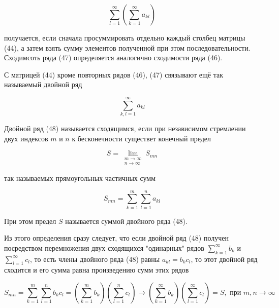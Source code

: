\begin{equation}
	\displaystyle\sum_{l = 1}^\infty \left( \displaystyle\sum_{k = 1}^\infty a_{kl} \right)
\end{equation}

получается, если сначала просуммировать отдельно каждый столбец матрицы (44), а затем взять сумму элементов полученной при этом последовательности. Сходимсоть ряда (47) определяется аналогично сходимости ряда (46).

С матрицей (44) кроме повторных рядов (46), (47) связывают ещё так называемый двойной ряд

\begin{equation}
	\displaystyle\sum_{k,l = 1}^\infty a_{kl}
\end{equation}

\begin{definition}
	Двойной ряд (48) называется сходящимся, если при независимом стремлении двух индексов $m$ и $n$ к бесконечности существет конечный предел
	
	\begin{equation}
		S = \displaystyle\lim_{\substack{m \rightarrow \infty \\ 
																		n \rightarrow \infty}} S_{mn}
	\end{equation}
	
	так называемых прямоугольных частичных сумм
	
	\begin{equation*}
		S_{mn} = \displaystyle\sum_{k = 1}^m \displaystyle\sum_{l = 1}^n a_{kl}
	\end{equation*}
	
	При этом предел $S$ называется суммой двойного ряда (48).
\end{definition}

Из этого определения сразу следует, что если двойной ряд (48) получен посредством перемножения двух сходящихся "одинарных" рядов {\small $\displaystyle\sum_{k = 1}^\infty b_k$} и {\small $\displaystyle\sum_{l = 1}^\infty c_l$}, то есть члены двойного ряда (48) равны $a_{kl}=b_kc_l$, то этот двойной ряд сходится и его сумма равна произведению сумм этих рядов

\begin{equation*}
	S_{mn} = \displaystyle\sum_{k = 1}^m \displaystyle\sum_{l = 1}^n b_kc_l = \left( \displaystyle\sum_{k = 1}^m b_k \right) \left( \displaystyle\sum_{l = 1}^n c_l \right) \rightarrow \left( \displaystyle\sum_{k = 1}^\infty b_k \right) \left( \displaystyle\sum_{l = 1}^\infty c_l \right) = S, \mbox{ при } m,n \rightarrow \infty
\end{equation*}

